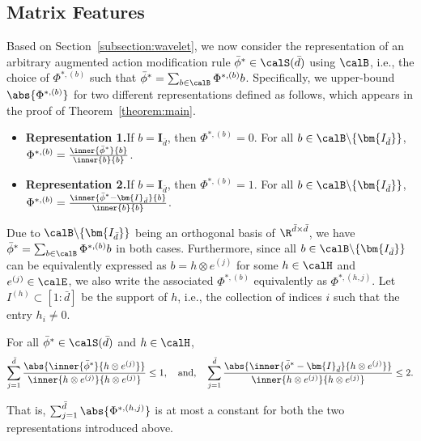 \documentclass[10pt]{article}
\begin{document}
\subsection{Matrix Features}\label{subsection:detail_matrix_feature}

Based on Section~\ref{subsection:wavelet}, we now consider the representation of an arbitrary augmented action modification rule $\bar\phi^*\in\calS(\bar d)$ using $\calB$, i.e., the choice of 
$\Phi^{*,(b)}$ such that $\bar\phi^*=\sum_{b\in\calB}\Phi^{*,(b)}b$. Specifically, we upper-bound $\abs{\Phi^{*,(b)}}$ for two different representations defined as follows, which appears in the proof of Theorem~\ref{theorem:main}.
\begin{itemize}
\item \textbf{Representation 1.}\quad If $b=\bm{I}_{\bar d}$, then $\Phi^{*,(b)}=0$. For all $b\in\calB\backslash\{\bm{I_{\bar d}}\}$, $\Phi^{*,(b)}=\frac{\inner{\bar\phi^*}{b}}{\inner{b}{b}}$.
\item \textbf{Representation 2.}\quad If $b=\bm{I}_{\bar d}$, then $\Phi^{*,(b)}=1$. For all $b\in\calB\backslash\{\bm{I_{\bar d}}\}$, $\Phi^{*,(b)}=\frac{\inner{\bar\phi^*-\bm{I}_{\bar d}}{b}}{\inner{b}{b}}$.
\end{itemize}
Due to $\calB\backslash\{\bm{I_{\bar d}}\}$ being an orthogonal basis of $\R^{\bar d\times\bar d}$, we have $\bar\phi^*=\sum_{b\in\calB}\Phi^{*,(b)}b$ in both cases. Furthermore, since all $b\in\calB\backslash\{\bm{I_{\bar d}}\}$ can be equivalently expressed as $b=h\otimes e^{(j)}$ for some $h\in\calH$ and $e^{(j)}\in\calE$, we also write the associated $\Phi^{*,(b)}$ equivalently as $\Phi^{*,(h,j)}$. Let $I^{(h)}\subset[1:\bar d]$ be the support of $h$, i.e., the collection of indices $i$ such that the entry $h_i\neq 0$. 

\begin{lemma}\label{lemma:coefficient_magnitude}
For all $\bar\phi^*\in\calS(\bar d)$ and $h\in\calH$,
\begin{equation*}
\sum_{j=1}^{\bar d}\frac{\abs{\inner{\bar\phi^*}{h\otimes e^{(j)}}}}{\inner{h\otimes e^{(j)}}{h\otimes e^{(j)}}}\leq 1,\quad\mathrm{and},\quad \sum_{j=1}^{\bar d}\frac{\abs{\inner{\bar\phi^*-\bm{I}_{\bar d}}{h\otimes e^{(j)}}}}{\inner{h\otimes e^{(j)}}{h\otimes e^{(j)}}}\leq 2.
\end{equation*}
\end{lemma}

That is, $\sum_{j=1}^{\bar d}\abs{\Phi^{*,(h,j)}}$ is at most a constant for both the two representations introduced above. 
\end{document}
